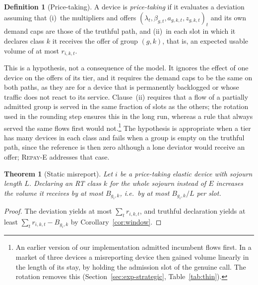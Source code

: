 \documentclass[preprint,11pt]{elsarticle}
\newtheorem{theorem}{Theorem}
\theoremstyle{definition}
\newtheorem{definition}{Definition}
\theoremstyle{remark}
\begin{document}
\begin{definition}[Price-taking]\label{def:pt}
A device is \emph{price-taking} if it evaluates a deviation assuming that (i)~the multipliers and offers $(\lambda_t,\beta_{g,t},a_{g,k,t},z_{g,k,t})_t$ and its own demand caps are those of the truthful path, and (ii)~in each slot in which it declares class $k$ it receives the offer of group $(g,k)$, that is, an expected usable volume of at most $r_{i,k,t}$.
\end{definition}

This is a hypothesis, not a consequence of the model.
It ignores the effect of one device on the offers of its tier, and it requires the demand caps to be the same on both paths, as they are for a device that is permanently backlogged or whose traffic does not react to its service.
Clause~(ii) requires that a flow of a partially admitted group is served in the same fraction of slots as the others; the rotation used in the rounding step ensures this in the long run, whereas a rule that always served the same flows first would not.\footnote{An earlier version of our implementation admitted incumbent flows first. In a market of three devices a misreporting device then gained volume linearly in the length of its stay, by holding the admission slot of the genuine call. The rotation removes this (Section~\ref{sec:exp-strategic}, Table~\ref{tab:thin}).}
The hypothesis is appropriate when a tier has many devices in each class and fails when a group is empty on the truthful path, since the reference is then zero although a lone deviator would receive an offer; \textsc{Repay-E} addresses that case.

\begin{theorem}[Static misreport]\label{thm:static}
Let $i$ be a price-taking elastic device with sojourn length $L$.
Declaring an RT class $k$ for the whole sojourn instead of $E$ increases the volume it receives by at most $B_{g_i,k}$, i.e.\ by at most $B_{g_i,k}/L$ per slot.
\end{theorem}
\begin{proof}
The deviation yields at most $\sum_t r_{i,k,t}$, and truthful declaration yields at least $\sum_t r_{i,k,t}-B_{g_i,k}$ by Corollary~\ref{cor:window}.
\end{proof}
\end{document}
